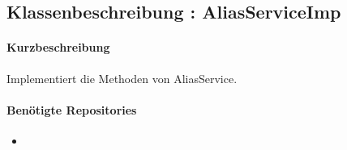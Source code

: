 \subsection{Klassenbeschreibung : AliasServiceImp}%
\paragraph*{Kurzbeschreibung}
Implementiert die Methoden von AliasService.
\paragraph*{Benötigte Repositories}
\begin{itemize}
    \item 
\end{itemize}
